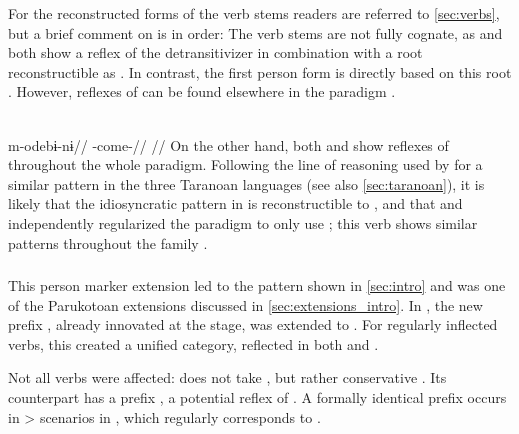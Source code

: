 

For the reconstructed forms of the \PPek verb stems readers are referred to \cref{sec:verbs}, but a brief comment on  is in order:
The verb stems are not fully cognate, as \ikpeng and \bakairi both show a reflex of the \PPek detransitivizer  in combination with a root reconstructible as .
In contrast, the \arara first person form is directly based on this root .
However, reflexes of  can be found elsewhere in the \arara paradigm .

\arara \parencite[][150]{alves2017arara}\\
\begingl
\gla m-odebɨ-nɨ//
\glb {}-come-//
\glft {}//
\endgl
\xe
%
On the other hand, both \ikpeng and \bakairi show reflexes of  throughout the whole paradigm.
Following the line of reasoning used by \textcite[114]{meira1998proto} for a similar pattern in the three Taranoan languages (see also \cref{sec:taranoan}), it is likely that the idiosyncratic pattern in \arara is reconstructible to \PPek, and that \bakairi and \ikpeng independently regularized the paradigm to only use ; this verb shows similar patterns throughout the family .

\subsubsection{\PWai {}}
\label{sec:waiwaian}
This person marker extension led to the \hixka pattern shown in \cref{sec:intro} and was one of the Parukotoan extensions discussed in \cref{sec:extensions_intro}.
In \PWai, the new  prefix , already innovated at the \PPar stage, was extended to .
For regularly inflected verbs, this created a unified  category, reflected in both \hixka and \waiwai {}.

Not all  verbs were affected: \waiwai {}  does not take , but rather conservative  .
Its \hixka counterpart has a prefix  , a potential reflex of  .
A formally identical prefix occurs in > scenarios in \hixka {}, which regularly corresponds to \waiwai {} .

